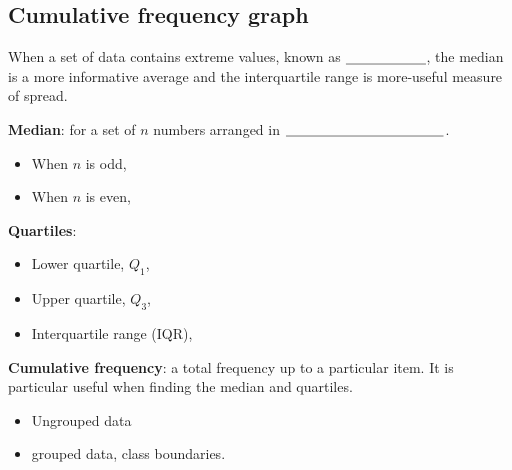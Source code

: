 \newpage

\subsection{Cumulative frequency graph}
\smallskip

When a set of data contains extreme values, known as $\underline{\hspace{2 cm}}$, the median is a more informative average and the interquartile range is more-useful measure of spread. 

\medskip

\textbf{Median}: for a set of $n$ numbers arranged in $\underline{\hspace{4 cm}}$.

\begin{itemize}
		\setlength\itemsep{0.8em}
	\item When $n$ is odd, 
	\item  When $n$ is even,
\end{itemize}


\textbf{Quartiles}:

\begin{itemize}
	\setlength\itemsep{0.8em}
	\item Lower quartile, $Q_1$, 
	\item  Upper quartile, $Q_3$, 
	\item  Interquartile range (IQR), 
\end{itemize}
\bigskip


\textbf{Cumulative frequency}: a total frequency up to a particular item. It is particular useful when finding the median and quartiles. 

\medskip  

\begin{itemize}
	\setlength\itemsep{0.8em}
	\item Ungrouped data
	\item  grouped data,  class boundaries.
 
\end{itemize}
\bigskip

\exercise  %

